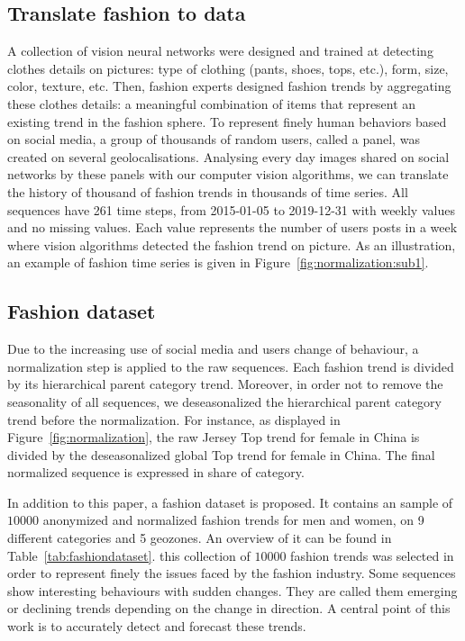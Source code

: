 \documentclass{article} %
\newcommand{\numberts}{10000}
\begin{document}
\subsection{Translate fashion to data}
\label{sec:dataset:a}
A collection of vision neural networks were designed and trained  at detecting clothes details on pictures: type of clothing (pants, shoes, tops, etc.), form, size, color, texture, etc. Then, fashion experts designed fashion trends by aggregating these clothes details: a meaningful combination of items that represent an existing trend in the fashion sphere. To represent finely human behaviors based on social media, a group of thousands of random users, called a panel, was created on several geolocalisations. Analysing every day images shared on social networks by these panels with our computer vision algorithms, we can translate the history of thousand of fashion trends in thousands of time series.  All sequences have 261 time steps, from 2015-01-05 to 2019-12-31 with weekly values and no missing values. Each value represents the number of users posts in a week where vision algorithms detected the fashion trend on picture.  As an illustration, an example of fashion time series is given in Figure~\ref{fig:normalization:sub1}.

\subsection{Fashion dataset}
\label{sec:dataset:b}

Due to the increasing use of social media and users change of behaviour, a normalization step is applied to the raw sequences. Each fashion trend is divided by its hierarchical parent category trend. Moreover, in order not to remove the seasonality of all sequences, we deseasonalized the hierarchical parent category trend before the normalization. For instance, as displayed in Figure~\ref{fig:normalization}, the raw Jersey Top trend for female in China is divided by the deseasonalized global Top trend for female in China. The final normalized sequence is expressed in share of category.

In addition to this paper, a fashion dataset is proposed. It contains an sample of $\numberts$ anonymized and  normalized fashion trends for men and women, on 9 different categories and 5 geozones. An overview of it can be found in Table~\ref{tab:fashiondataset}. this collection of $\numberts$ fashion trends was selected in order to represent finely the issues faced by the fashion industry. Some sequences show interesting behaviours with sudden changes. They are called them emerging or declining trends depending on the change in direction. A central point of this work is to accurately detect and forecast these trends.
\end{document}
